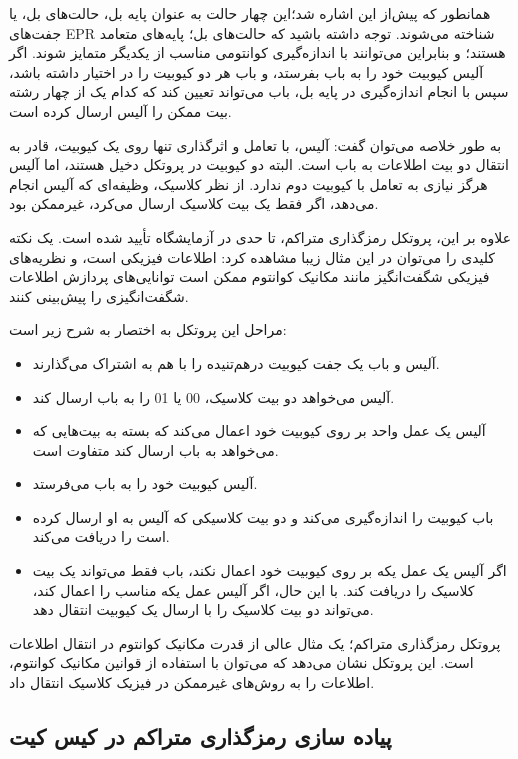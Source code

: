 \documentclass{book}
\begin{document}
همانطور که پیش‌از این اشاره شد؛این چهار حالت به عنوان پایه بل، حالت‌های بل، یا جفت‌های EPR شناخته می‌شوند.
 توجه داشته باشید که حالت‌های بل؛ پایه‌های متعامد هستند؛ و بنابراین می‌توانند با اندازه‌گیری کوانتومی مناسب از یکدیگر متمایز شوند. اگر آلیس کیوبیت خود را به باب بفرستد، و باب هر دو کیوبیت را در اختیار داشته باشد، سپس با انجام اندازه‌گیری در پایه بل، باب می‌تواند تعیین کند که کدام یک از چهار رشته بیت ممکن را آلیس ارسال کرده است.

به طور خلاصه می‌توان گفت:
 آلیس، با تعامل و اثرگذاری تنها روی یک کیوبیت، قادر به انتقال دو بیت اطلاعات به باب است. البته دو کیوبیت در پروتکل دخیل هستند، اما آلیس هرگز نیازی به تعامل با کیوبیت دوم ندارد. از نظر کلاسیک، وظیفه‌ای که آلیس انجام می‌دهد، اگر فقط یک بیت کلاسیک ارسال می‌کرد، غیرممکن بود.

علاوه بر این، پروتکل رمزگذاری متراکم، تا حدی در آزمایشگاه تأیید شده است.  یک نکته کلیدی را می‌توان در این مثال زیبا مشاهده کرد: اطلاعات فیزیکی است، و نظریه‌های فیزیکی شگفت‌انگیز مانند مکانیک کوانتوم ممکن است توانایی‌های پردازش اطلاعات شگفت‌انگیزی را پیش‌بینی کنند.

مراحل این پروتکل به اختصار به شرح زیر است:\\

\begin{itemize}
	\item آلیس و باب یک جفت کیوبیت درهم‌تنیده را با هم به اشتراک می‌گذارند.
	\item آلیس می‌خواهد دو بیت کلاسیک، 00 یا 01 را به باب ارسال کند.
	\item آلیس یک عمل واحد بر روی کیوبیت خود اعمال می‌کند که بسته به بیت‌هایی که می‌خواهد به باب ارسال کند متفاوت است.
	\item آلیس کیوبیت خود را به باب می‌فرستد.
	\item باب کیوبیت را اندازه‌گیری می‌کند و دو بیت کلاسیکی که آلیس به او ارسال کرده است را دریافت می‌کند.
	\item اگر آلیس یک عمل یکه بر روی کیوبیت خود اعمال نکند، باب فقط می‌تواند یک بیت کلاسیک را دریافت کند. با این حال، اگر آلیس عمل یکه مناسب را اعمال کند، می‌تواند دو بیت کلاسیک را با ارسال یک کیوبیت انتقال دهد.
\end{itemize}

پروتکل رمزگذاری متراکم؛ یک مثال عالی از قدرت مکانیک کوانتوم در انتقال اطلاعات است. این پروتکل نشان می‌دهد که می‌توان با استفاده از قوانین مکانیک کوانتوم، اطلاعات را به روش‌های غیرممکن در فیزیک کلاسیک انتقال داد.

\subsection{پیاده سازی رمزگذاری متراکم در کیس کیت}
\end{document}
